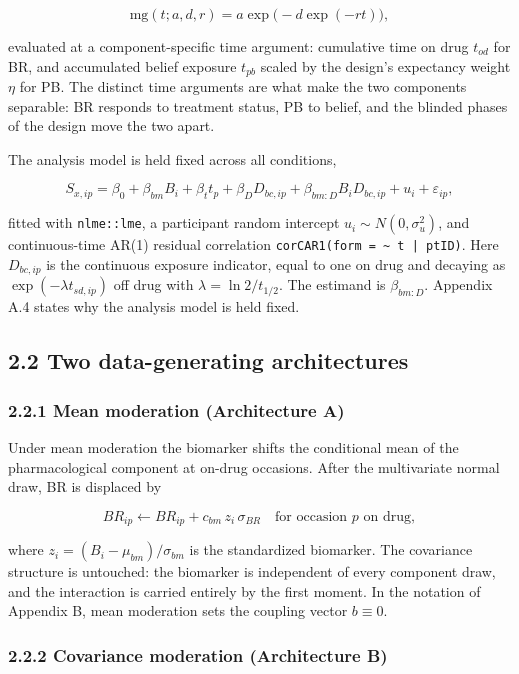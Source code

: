 \documentclass[
  11pt,
]{article}
\begin{document}
\[
\mathrm{mg}(t; a, d, r) = a \exp\!\big(-d \exp(-r t)\big),
\]

evaluated at a component-specific time argument: cumulative time on
drug \(t_{od}\) for BR, and accumulated belief exposure \(t_{pb}\) scaled
by the design's expectancy weight \(\eta\) for PB. The distinct time
arguments are what make the two components separable: BR responds to
treatment status, PB to belief, and the blinded phases of the design
move the two apart.

The analysis model is held fixed across all conditions,

\[
S_{x,ip} = \beta_0 + \beta_{bm} B_i + \beta_t t_p
  + \beta_D D_{bc,ip} + \beta_{bm:D} B_i D_{bc,ip}
  + u_i + \varepsilon_{ip},
\]

fitted with \texttt{nlme::lme}, a participant random intercept \(u_i
\sim N(0, \sigma_u^2)\), and continuous-time AR(1) residual
correlation \texttt{corCAR1(form = \textasciitilde\ t | ptID)}. Here
\(D_{bc,ip}\) is the continuous exposure indicator, equal to one on
drug and decaying as \(\exp(-\lambda t_{sd,ip})\) off drug with
\(\lambda = \ln 2 / t_{1/2}\). The estimand is \(\beta_{bm:D}\).
Appendix A.4 states why the analysis model is held fixed.

\subsection{2.2 Two data-generating architectures}

\subsubsection{2.2.1 Mean moderation (Architecture A)}

Under mean moderation the biomarker shifts the conditional mean of
the pharmacological component at on-drug occasions. After the
multivariate normal draw, BR is displaced by

\[
BR_{ip} \leftarrow BR_{ip} + c_{bm}\, z_i\, \sigma_{BR}
  \quad \text{for occasion } p \text{ on drug},
\]

where \(z_i = (B_i - \mu_{bm})/\sigma_{bm}\) is the standardized
biomarker. The covariance structure is untouched: the biomarker is
independent of every component draw, and the interaction is carried
entirely by the first moment. In the notation of Appendix B, mean
moderation sets the coupling vector \(b \equiv 0\).

\subsubsection{2.2.2 Covariance moderation (Architecture B)}
\end{document}
